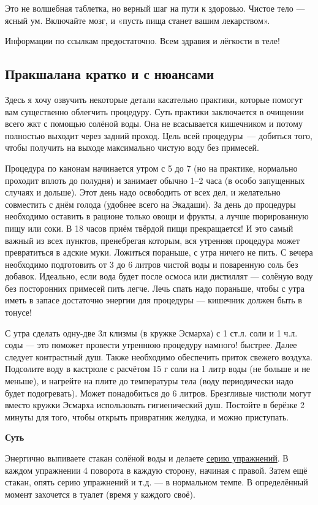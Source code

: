 Это не волшебная таблетка, но верный шаг на пути к здоровью. Чистое тело — ясный ум. Включайте мозг, и «пусть пища станет вашим лекарством». 

Информации по ссылкам предостаточно. 
Всем здравия и лёгкости в теле!

\subsection{Пракшалана кратко и с нюансами}\label{fasting1}
Здесь я хочу озвучить некоторые детали касательно практики, которые помогут вам существенно облегчить процедуру.
Суть практики заключается в очищении всего жкт с помощью солёной воды. Она не всасывается кишечником и потому полностью выходит через задний проход. Цель всей процедуры~--- добиться того, чтобы получить на выходе максимально чистую воду без примесей.

Процедура по канонам начинается утром с 5 до 7 (но на практике, нормально проходит вплоть до полудня) и занимает обычно 1–2 часа (в особо запущенных случаях и дольше). Этот день надо освободить от всех дел, и желательно совместить с днём голода (удобнее всего на Экадаши). За день до процедуры необходимо оставить в рационе только овощи и фрукты, а лучше пюрированную пищу или соки. В 18 часов приём твёрдой пищи прекращается! И это самый важный из всех пунктов, пренебрегая которым, вся утренняя процедура может превратиться в адские муки. Ложиться пораньше, с утра ничего не пить.
С вечера необходимо подготовить от 3 до 6 литров чистой воды и поваренную соль без добавок. Идеально, если вода будет после осмоса или дистиллят — солёную воду без посторонних примесей пить легче. Лечь спать надо пораньше, чтобы с утра иметь в запасе достаточно энергии для процедуры — кишечник должен быть в тонусе!

С утра сделать одну-две 3л клизмы (в кружке Эсмарха) с 1 ст.л. соли и 1 ч.л. соды — это поможет провести утреннюю процедуру намного! быстрее. Далее следует контрастный душ. Также необходимо обеспечить приток свежего воздуха. Подсолите воду в кастрюле с расчётом 15 г соли на 1 литр воды (не больше и не меньше), и нагрейте на плите до температуры тела (воду периодически надо будет подогревать). Может понадобиться до 6 литров. Брезгливые чистюли могут вместо кружки Эсмарха использовать гигиенический душ.
Постойте в берёзке 2 минуты для того, чтобы открыть привратник желудка, и можно приступать.

\textbf{Суть}

Энергично выпиваете стакан солёной воды и делаете \href{http://youtu.be/-jrGWPXai2g}{серию упражнений}. В каждом упражнении 4 поворота в каждую сторону, начиная с правой. Затем ещё стакан, опять серию упражнений и т.д. — в нормальном темпе. В определённый момент захочется в туалет (время у каждого своё).

